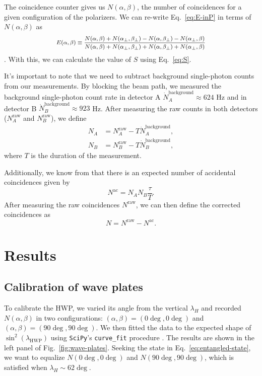 \documentclass{../paper}
\newcommand{\eq}[1]{Eq.~\eqref{#1}}
\newcommand{\fig}[1]{Fig.~\ref{#1}}
\begin{document}
The coincidence counter gives us $N(\alpha,\beta)$, the number of coincidences for a given configuration of the polarizers. We can re-write \eq{eq:E-inP} in terms of $N(\alpha,\beta)$ as
\begin{equation}\label{eq:E}
  \footnotesize
  \begin{aligned}
    E(\alpha,\beta) \equiv \frac{N(\alpha,\beta) + N(\alpha_\perp,\beta_\perp) - N(\alpha,\beta_\perp) - N(\alpha_\perp,\beta)}{N(\alpha,\beta) + N(\alpha_\perp,\beta_\perp) + N(\alpha,\beta_\perp) + N(\alpha_\perp,\beta)}
  \end{aligned}
\end{equation}
\cite{Dehlinger2002}. With this, we can calculate the value of $S$ using \eq{eq:S}.

It's important to note that we need to subtract background single-photon counts from our measurements. By blocking the beam path, we measured the background single-photon count rate in detector A $\dot N_A^\text{background} \approx 624$ Hz and in detector B $\dot N_B^\text{background} \approx 923$ Hz. After measuring the raw counts in both detectors ($N_A^\text{raw}$ and $N_B^\text{raw}$), we define
\begin{align}
  N_A &= N_A^\text{raw} - T \dot N_A^\text{background}, \\
  N_B &= N_B^\text{raw} - T \dot N_B^\text{background},
\end{align}
where $T$ is the duration of the measurement.

Additionally, we know from \cite{LabManual} that there is an expected number of accidental coincidences given by
\begin{equation}
  N^\text{ac} = N_A N_B \frac{\tau}{T}.
\end{equation}
After measuring the raw coincidences $N^\text{raw}$, we can then define the corrected coincidences as
\begin{equation}
  N = N^\text{raw} - N^\text{ac}.
\end{equation}

\section{Results}

\subsection{Calibration of wave plates}

To calibrate the HWP, we varied its angle from the vertical $\lambda_H$ and recorded $N(\alpha, \beta)$ in two configurations: $(\alpha,\beta) = (0\deg, 0\deg)$ and $(\alpha,\beta) = (90\deg, 90\deg)$. We then fitted the data to the expected shape of $\sin^2(\lambda_\text{HWP})$ using {\tt SciPy}'s {\tt curve\_fit} procedure \cite{SciPy}. The results are shown in the left panel of \fig{fig:wave-plates}. Seeking the state in \eq{eq:entangled-state}, we want to equalize $N(0\deg,0\deg)$ and $N(90\deg,90\deg)$, which is satisfied when $\lambda_H \sim 62\deg$.
\end{document}
